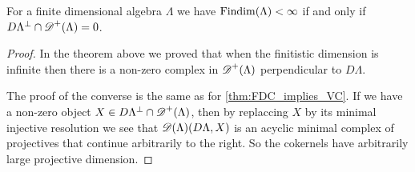 \begin{theorem}\cite[Theorem~4.4]{Rick19}
	For a finite dimensional algebra $\Lambda$ we have $\operatorname{Findim}(\Lambda) < \infty$ if and only if $D\Lambda^\perp \cap \operatorname{\mathscr{D}}^+(\Lambda) = 0$.
	\begin{proof}
		In the theorem above we proved that when the finitistic dimension is infinite then there is a non-zero complex in $\operatorname{\mathscr{D}}^+(\Lambda)$ perpendicular to $D\Lambda$. 
		
		The proof of the converse is the same as for \cref{thm:FDC_implies_VC}. If we have a non-zero object $X \in D\Lambda^\perp \cap \operatorname{\mathscr{D}}^+(\Lambda)$, then by replaccing $X$ by its minimal injective resolution we see that $\operatorname{\mathscr{D}}(\Lambda)(D\Lambda, X)$ is an acyclic minimal complex of projectives that continue arbitrarily to the right. So the cokernels have arbitrarily large projective dimension. 
	\end{proof}
\end{theorem}